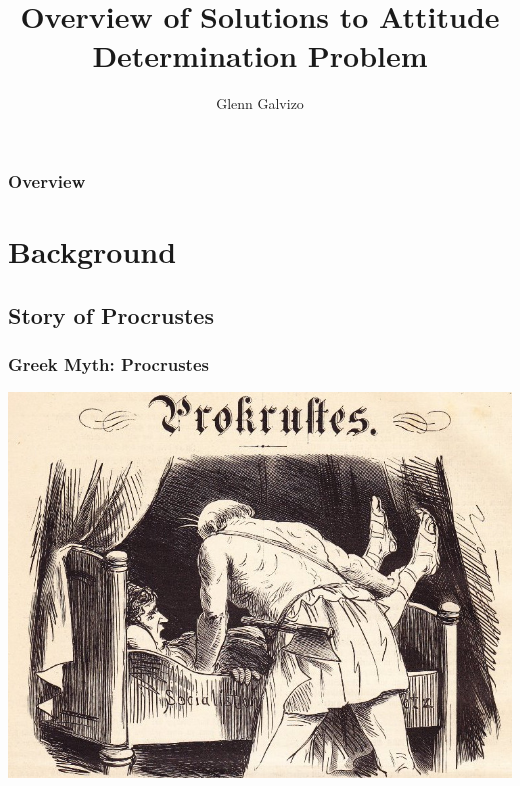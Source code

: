 \documentclass[11pt]{beamer}
\author{Glenn Galvizo}
\title{Overview of Solutions to Attitude Determination Problem}
\institute{University of Hawaii at Manoa}
\begin{document}
    \begin{frame}
        \titlepage
    \end{frame}

    \begin{frame}
        \frametitle{Overview}
        \tableofcontents
    \end{frame}

    \section{Background}\label{sec:background}
    \subsection{Story of Procrustes}\label{subsec:storyOfProcrustes}
    \begin{frame}
        \frametitle{Greek Myth: Procrustes}
        \centerline{\includegraphics[scale=1.3]{images/procrustes}}
    \end{frame}

\end{document}
